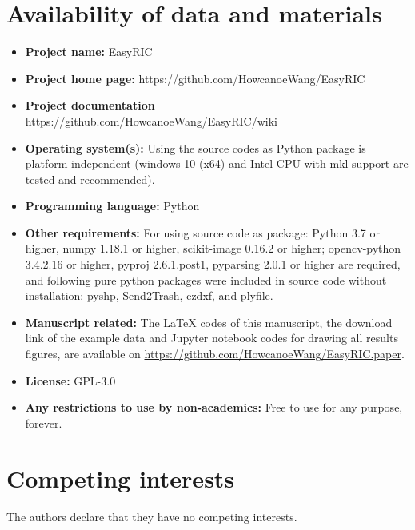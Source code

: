 \documentclass{configs/bmcart}
\begin{document}
\begin{backmatter}
\section*{Availability of data and materials}
\begin{itemize}
  \item \textbf{Project name:} EasyRIC
  \item \textbf{Project home page:} https://github.com/HowcanoeWang/EasyRIC
  \item \textbf{Project documentation} https://github.com/HowcanoeWang/EasyRIC/wiki
  \item \textbf{Operating system(s):} Using the source codes as Python package is platform independent (windows 10 (x64) and Intel CPU with \acrfull*{mkl} support are tested and recommended).
  \item \textbf{Programming language: } Python
  \item \textbf{Other requirements:} For using source code as package: Python 3.7 or higher, numpy 1.18.1 or higher, scikit-image 0.16.2 or higher; opencv-python 3.4.2.16 or higher, pyproj 2.6.1.post1, pyparsing 2.0.1 or higher are required, and following pure python packages were included in source code without installation: pyshp, Send2Trash, ezdxf, and plyfile.
  \item \textbf{Manuscript related:} The LaTeX codes of this manuscript, the download link of the example data and Jupyter notebook codes for drawing all results figures, are available on \url{https://github.com/HowcanoeWang/EasyRIC.paper}.
  \item \textbf{License:} GPL-3.0
  \item \textbf{Any restrictions to use by non-academics:} Free to use for any purpose, forever.
\end{itemize}

\section*{Competing interests}
The authors declare that they have no competing interests.



\end{backmatter}
\end{document}
